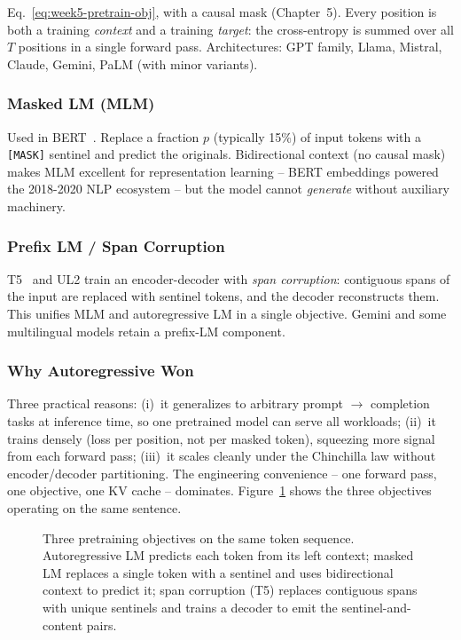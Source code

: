 Eq.~\eqref{eq:week5-pretrain-obj}, with a causal mask (Chapter~5).
Every position is both a training \emph{context} and a training
\emph{target}: the cross-entropy is summed over all $T$ positions in a
single forward pass. Architectures: GPT family, Llama, Mistral,
Claude, Gemini, PaLM (with minor variants).

\subsubsection{Masked LM (MLM)}

Used in BERT~\citep{devlin2019bert}. Replace a fraction $p$ (typically
15\%) of input tokens with a \texttt{[MASK]} sentinel and predict the
originals. Bidirectional context (no causal mask) makes MLM excellent
for representation learning -- BERT embeddings powered the 2018-2020
NLP ecosystem -- but the model cannot \emph{generate} without
auxiliary machinery.

\subsubsection{Prefix LM / Span Corruption}

T5~\citep{raffel2020t5} and UL2 train an encoder-decoder with
\emph{span corruption}: contiguous spans of the input are replaced
with sentinel tokens, and the decoder reconstructs them. This
unifies MLM and autoregressive LM in a single objective. Gemini and
some multilingual models retain a prefix-LM component.

\subsubsection{Why Autoregressive Won}

Three practical reasons:
(i)~it generalizes to arbitrary prompt $\to$ completion tasks at
inference time, so one pretrained model can serve all workloads;
(ii)~it trains densely (loss per position, not per masked token),
squeezing more signal from each forward pass;
(iii)~it scales cleanly under the Chinchilla law without
encoder/decoder partitioning. The engineering convenience -- one
forward pass, one objective, one KV cache -- dominates.
Figure~\ref{fig:pretraining_objectives} shows the three objectives
operating on the same sentence.

\begin{figure}[H]
  \centering
  
  \caption{Three pretraining objectives on the same token
           sequence. Autoregressive LM predicts each token from
           its left context; masked LM replaces a single token
           with a sentinel and uses bidirectional context to
           predict it; span corruption (T5) replaces contiguous
           spans with unique sentinels and trains a decoder to
           emit the sentinel-and-content pairs.}
  \label{fig:pretraining_objectives}
\end{figure}

